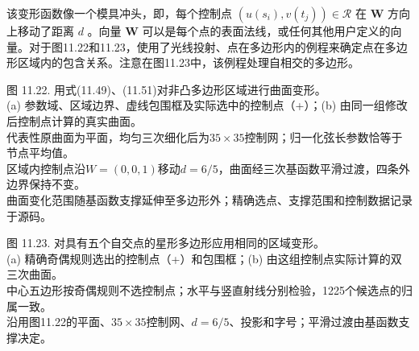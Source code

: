 \documentclass[../main.tex]{subfiles}
\begin{document}
该变形函数像一个模具冲头，即，每个控制点 \(\left( {u\left( {s}_{i}\right) ,v\left( {t}_{j}\right) }\right)  \in  \mathcal{R}\) 在 \(\mathbf{W}\) 方向上移动了距离 \(d\) 。向量 \(\mathbf{W}\) 可以是每个点的表面法线，或任何其他用户定义的向量。对于图11.22和11.23，使用了光线投射、点在多边形内的例程来确定点在多边形区域内的包含关系。注意在图11.23中，该例程处理自相交的多边形。
\begin{center}
\begin{minipage}{37cm}
\centering
\begin{minipage}[c]{17cm}\centering
{}
\end{minipage}\hspace{.5cm}
\begin{minipage}[c]{19cm}\centering
{}
\end{minipage}
\par\smallskip
图 11.22. 用式(11.49)、(11.51)对非凸多边形区域进行曲面变形。\\
(a) 参数域、区域边界、虚线包围框及实际选中的控制点（+）；(b) 由同一组修改后控制点计算的真实曲面。\\
代表性原曲面为平面，均匀三次细化后为$35\times35$控制网；归一化弦长参数恰等于节点平均值。\\
区域内控制点沿$W=(0,0,1)$移动$d=6/5$，曲面经三次基函数平滑过渡，四条外边界保持不变。\\
曲面变化范围随基函数支撑延伸至多边形外；精确选点、支撑范围和控制数据记录于源码。
\end{minipage}
\end{center}




\begin{center}
\begin{minipage}{37cm}
\centering
\begin{minipage}[c]{17cm}\centering
{}
\end{minipage}\hspace{.5cm}
\begin{minipage}[c]{19cm}\centering
{}
\end{minipage}
\par\smallskip
图 11.23. 对具有五个自交点的星形多边形应用相同的区域变形。\\
(a) 精确奇偶规则选出的控制点（+）和包围框；(b) 由这组控制点实际计算的双三次曲面。\\
中心五边形按奇偶规则不选控制点；水平与竖直射线分别检验，1225个候选点的归属一致。\\
沿用图11.22的平面、$35\times35$控制网、$d=6/5$、投影和字号；平滑过渡由基函数支撑决定。
\end{minipage}
\end{center}
\end{document}
